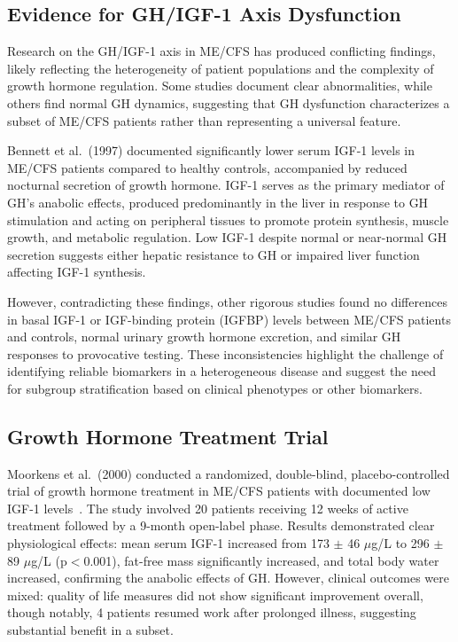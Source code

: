 \subsection{Evidence for GH/IGF-1 Axis Dysfunction}

Research on the GH/IGF-1 axis in ME/CFS has produced conflicting findings, likely reflecting the heterogeneity of patient populations and the complexity of growth hormone regulation. Some studies document clear abnormalities, while others find normal GH dynamics, suggesting that GH dysfunction characterizes a subset of ME/CFS patients rather than representing a universal feature.

\begin{observation}
\label{obs:igf1-low}
Bennett et al.\ (1997) documented significantly lower serum IGF-1 levels in ME/CFS patients compared to healthy controls, accompanied by reduced nocturnal secretion of growth hormone. IGF-1 serves as the primary mediator of GH's anabolic effects, produced predominantly in the liver in response to GH stimulation and acting on peripheral tissues to promote protein synthesis, muscle growth, and metabolic regulation. Low IGF-1 despite normal or near-normal GH secretion suggests either hepatic resistance to GH or impaired liver function affecting IGF-1 synthesis.
\end{observation}

However, contradicting these findings, other rigorous studies found no differences in basal IGF-1 or IGF-binding protein (IGFBP) levels between ME/CFS patients and controls, normal urinary growth hormone excretion, and similar GH responses to provocative testing. These inconsistencies highlight the challenge of identifying reliable biomarkers in a heterogeneous disease and suggest the need for subgroup stratification based on clinical phenotypes or other biomarkers.

\subsection{Growth Hormone Treatment Trial}

\begin{achievement}
\label{ach:gh-treatment}
Moorkens et al.\ (2000) conducted a randomized, double-blind, placebo-controlled trial of growth hormone treatment in ME/CFS patients with documented low IGF-1 levels~\cite{moorkens2000gh}. The study involved 20 patients receiving 12 weeks of active treatment followed by a 9-month open-label phase. Results demonstrated clear physiological effects: mean serum IGF-1 increased from 173 $\pm$ 46 $\mu$g/L to 296 $\pm$ 89 $\mu$g/L (p$<$0.001), fat-free mass significantly increased, and total body water increased, confirming the anabolic effects of GH. However, clinical outcomes were mixed: quality of life measures did not show significant improvement overall, though notably, 4 patients resumed work after prolonged illness, suggesting substantial benefit in a subset.
\end{achievement}

